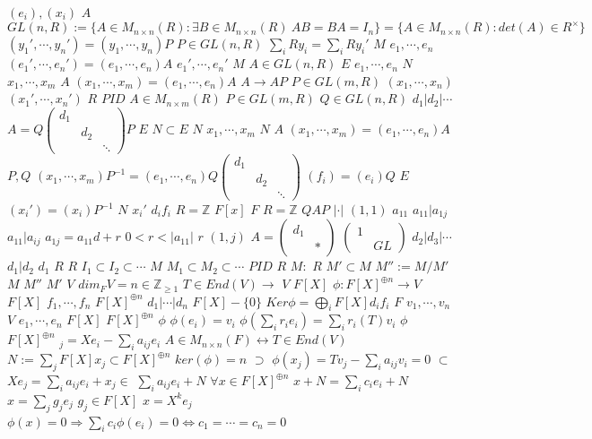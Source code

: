 \documentclass{article}
\begin{document}
$(e_i),(x_i)$
$A$
$$GL(n,R):= \{A \in M_{n \times n}(R): \exists B \in M_{n \times n}(R)\ AB=BA=I_n\} =\{A \in M_{n \times n}(R):det(A) \in R^\times\}$$
$(y_1',\cdots,y_n')=(y_1,\cdots,y_n)P$
$P \in GL(n,R)$
$\sum_{i}Ry_i=\sum_iRy_i'$
$M$
$e_1,\cdots,e_n$
$(e_1',\cdots,e_n')=(e_1,\cdots,e_n)A$
$e_1' ,\cdots,e_n'$
$M$
$A \in GL(n,R)$
$E$
$e_1,\cdots,e_n$
$N$
$x_1,\cdots,x_m$
$A$
$(x_1,\cdots,x_m)=(e_1,\cdots,e_n)A$
$A \rightarrow AP$
$P \in GL(m,R)$
$(x_1,\cdots,x_n)$
$(x_1',\cdots,x_n')$
$R$
$PID$
$A \in M_{n \times m}(R)$
$P \in GL(m,R)$
$Q \in GL(n,R)$
$d_1|d_2|\cdots$
$A=Q \begin{pmatrix}d_1\\&d_2\\&&\ddots\end{pmatrix} P$
$E$
$N \subset E$
$N$
$x_1,\cdots,x_m$
$N$
$A$
$(x_1,\cdots,x_m)=(e_1,\cdots,e_n)A$
$P,Q$
$(x_1,\cdots,x_m)P^{-1}=(e_1,\cdots,e_n)Q \begin{pmatrix}d_1\\&d_2\\&&\ddots\end{pmatrix}$
$(f_i)=(e_i)Q$
$E$
$(x_i')=(x_i)P^{-1}$
$N$
$x_i'$
$d_if_i$
$R=\mathbb{Z}$
$F[x]$
$F$
$R=\mathbb{Z}$
$QAP$
$|\cdot|$
$(1,1)$
$a_{11}$
$a_{11}|a_{1j}$
$a_{11}|a_{ij}$
$a_{1j}=a_{11}d+r$
$0<r<|a_{11}|$
$r$
$(1,j)$
$A=\begin{pmatrix}d_1\\&*\end{pmatrix}$
$\begin{pmatrix}1&\\&GL\end{pmatrix}$
$d_2|d_3|\cdots$
$d_1|d_2$
$d_1$
$R$
$R$
$I_1 \subset I_2 \subset \cdots$
$M$
$M_1 \subset M_2 \subset \cdots$
$PID$
$R$
$M:$
$R$
$M' \subset M$
$M'':=M/M'$
$M$
$M''$
$M'$
$V$
$dim_FV=n \in \mathbb{Z}_{\geq 1}$
$T \in End(V) \rightarrow$
$V$
$F[X]$
$\phi:F[X]^{\oplus n} \rightarrow V$
$F[X]$
$f_1,\cdots,f_n$
$F[X]^{\oplus n}$
$d_1|\cdots|d_n$
$F[X]-\{0\}$
$Ker \phi=\bigoplus_iF[X]d_if_i$
$F$
$v_1,\cdots,v_n$
$V$
$e_1,\cdots,e_n$
$F[X]$
$F[X]^{\oplus n}$
$\phi$
$\phi(e_i)=v_i$
$\phi(\sum_ir_ie_i)=\sum_ir_i(T)v_i$
$\phi$
$F[X]^{\oplus n}$
$_j=Xe_i-\sum_ia_{ij}e_i$
$A \in M_{n \times n}(F) \leftrightarrow T \in End(V)$
$N:=\sum_jF[X]x_j \subset F[X]^{\oplus n}$
$ker(\phi)=n$
$\supset$
$\phi(x_j)=Tv_j-\sum_ia_{ij}v_i=0$
$\subset$
$Xe_j=\sum_ia_{ij}e_i+x_j \in$
$\sum_ia_{ij}e_i+N$
$\forall x \in F[X]^{\oplus n}$
$x+N=\sum_ic_ie_i+N$
$x=\sum_jg_je_j$
$g_j \in F[X]$
$x=X^ke_j$
$\phi(x)=0 \Rightarrow \sum_ic_i \phi(e_i)=0 \Leftrightarrow c_1=\cdots=c_n=0$
\end{document}
